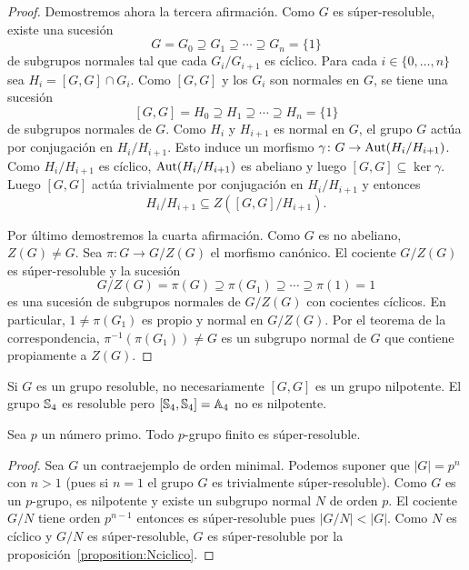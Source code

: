 \begin{proof}
	Demostremos ahora la tercera afirmación. Como $G$ es súper-resoluble, existe
	una sucesión
	\[
	G=G_0\supseteq G_1\supseteq\cdots\supseteq G_n=\{1\}
	\]
	de subgrupos normales tal que cada $G_i/G_{i+1}$ es cíclico. Para cada
	$i\in\{0,\dots,n\}$ sea $H_i=[G,G]\cap G_i$. Como $[G,G]$ y los $G_i$ son
	normales en $G$, se tiene una sucesión
	\[
	[G,G]=H_0\supseteq H_1\supseteq\cdots\supseteq H_n=\{1\}
	\]
	de subgrupos normales de $G$. Como $H_i$ y $H_{i+1}$ es normal en $G$, el
	grupo $G$ actúa por conjugación en $H_i/H_{i+1}$. Esto induce un morfismo
	$\gamma\colon G\to\operatorname{Aut}(H_i/H_{i+1})$. Como $H_i/H_{i+1}$ es cíclico, 
	$\operatorname{Aut}(H_i/H_{i+1})$ es abeliano y luego $[G,G]\subseteq\ker \gamma$. Luego
	$[G,G]$ actúa trivialmente por conjugación en $H_{i}/H_{i+1}$ y entonces
	\[
	H_i/H_{i+1}\subseteq Z([G,G]/H_{i+1}).
	\]

	Por último demostremos la cuarta afirmación. Como $G$ es no abeliano,
	$Z(G)\ne G$. Sea $\pi\colon G\to G/Z(G)$ el morfismo canónico.  El cociente
	$G/Z(G)$ es súper-resoluble y la sucesión
	\[
	G/Z(G)=\pi(G)\supseteq \pi(G_1)\supseteq\cdots\supseteq \pi(1)=1
	\]
	es una sucesión de subgrupos normales de $G/Z(G)$ con cocientes cíclicos.
	En particular, $1\ne \pi(G_1)$ es propio y normal en $G/Z(G)$.  Por el
	teorema de la correspondencia, $\pi^{-1}(\pi(G_1))\ne G$ es un subgrupo normal
	de $G$ que contiene propiamente a $Z(G)$. 
\end{proof}

\begin{example}
	Si $G$ es un grupo resoluble, no necesariamente $[G,G]$ es un grupo nilpotente. El grupo
	$\mathbb{S}_4$ es resoluble pero $[\mathbb{S}_4,\mathbb{S}_4]=\mathbb{A}_4$ no es nilpotente.
\end{example}

\begin{proposition}
	\label{proposition:psuper}
	Sea $p$ un número primo.  Todo $p$-grupo finito es súper-resoluble.
\end{proposition}

\begin{proof}
	Sea $G$ un contraejemplo de orden minimal. Podemos suponer que $|G|=p^n$
	con $n>1$ (pues si $n=1$ el grupo $G$ es trivialmente súper-resoluble).
	Como $G$ es un $p$-grupo, es nilpotente  y existe un subgrupo normal $N$ de
	orden $p$. El cociente $G/N$ tiene orden $p^{n-1}$ entonces es
	súper-resoluble pues $|G/N|<|G|$. Como $N$ es cíclico y $G/N$ es
	súper-resoluble, $G$ es súper-resoluble por la
	proposición~\ref{proposition:Nciclico}.
\end{proof}


